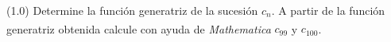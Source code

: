 (1.0) Determine la función generatriz de la sucesión $c_n$. A partir de la función generatriz obtenida calcule con ayuda de \textit{Mathematica}\textsuperscript{\textregistered} $c_{99}$ y $c_{100}$.